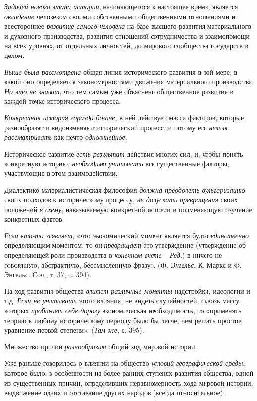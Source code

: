 \documentclass[a4paper,14pt,russian]{extreport}
\begin{document}
\emph{Задачей нового этапа истории}, начинающегося в настоящее время, является \emph{овладение} человеком своими собственными общественными отношениями и всестороннее \emph{развитие самого человека} на базе высшего развития материального и духовного производства, развития отношений сотрудничества и взаимопомощи на всех уровнях, от отдельных личностей, до мирового сообщества государств в целом.

\emph{Выше была рассмотрена} общая линия исторического развития в той мере, в какой оно определяется закономерностями движения материального производства. \emph{Но это не значит}, что тем самым уже объяснено общественное развитие в каждой точке исторического процесса.

\emph{Конкретная история гораздо богаче}, в ней действует масса факторов, которые разнообразят и видоизменяют исторический процесс, и потому его \emph{нельзя рассматривать} как нечто \emph{однолинейное}.

Историческое развитие \emph{есть результат} действия многих сил, и, чтобы понять конкретную историю, \emph{необходимо учитывать} все существенные факторы, участвующие в этом взаимодействии.

Диалектико-материалистическая философия \emph{должна преодолеть вульгаризацию} своих подходов к историческому процессу, \emph{не допускать превращения} своих положений \emph{в схему}, навязываемую конкретной \textsc{истории и} подменяющую изучение конкретных фактов.

\emph{Если кто-то заявляет}, «что экономический момент является будто \emph{единственно} определяющим моментом, то он \emph{превращает} это утверждение (утверждение об определяющей роли производства в \emph{конечном счете} -- \emph{Ред}.) в ничего не \textsc{говорящую,} абстрактную, бессмысленную фразу». (\emph{Ф. Энгельс}. К. Маркс и Ф. Энгельс. Соч., т. 37, \textsc{с.} 394).

На ход развития общества \emph{влияют различные моменты} надстройки, идеологии и т.д. \emph{Если не учитывать} этого влияния, не видеть случайностей, сквозь массу которых \emph{пробивает себе дорогу} экономическая необходимость, то «применять теорию к любому историческому периоду было бы легче, чем решать простое уравнение первой степени». (\emph{Там же}, с. 395).

Множество причин \emph{разнообразит} общий ход мировой истории.

Уже раньше говорилось о влиянии на общество \emph{условий географической среды}, которое было, в особенности на более ранних ступенях развития общества, одной из существенных причин, определивших неравномерность хода мировой истории, выдвижение одних и отставание других народов (всегда относительное).
\end{document}
